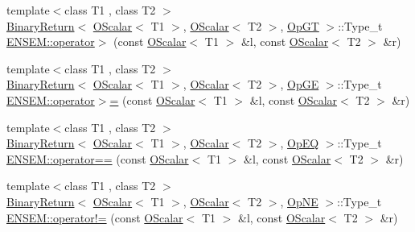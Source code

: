 \begin{DoxyCompactItemize}
\item 
{\footnotesize template$<$class T1 , class T2 $>$ }\\\mbox{\hyperlink{structENSEM_1_1BinaryReturn}{Binary\+Return}}$<$ \mbox{\hyperlink{classENSEM_1_1OScalar}{O\+Scalar}}$<$ T1 $>$, \mbox{\hyperlink{classENSEM_1_1OScalar}{O\+Scalar}}$<$ T2 $>$, \mbox{\hyperlink{structENSEM_1_1OpGT}{Op\+GT}} $>$\+::Type\+\_\+t \mbox{\hyperlink{group__obsscalar_ga8a16530cd60ff38f2be9575251898ac2}{E\+N\+S\+E\+M\+::operator$>$}} (const \mbox{\hyperlink{classENSEM_1_1OScalar}{O\+Scalar}}$<$ T1 $>$ \&l, const \mbox{\hyperlink{classENSEM_1_1OScalar}{O\+Scalar}}$<$ T2 $>$ \&r)
\item 
{\footnotesize template$<$class T1 , class T2 $>$ }\\\mbox{\hyperlink{structENSEM_1_1BinaryReturn}{Binary\+Return}}$<$ \mbox{\hyperlink{classENSEM_1_1OScalar}{O\+Scalar}}$<$ T1 $>$, \mbox{\hyperlink{classENSEM_1_1OScalar}{O\+Scalar}}$<$ T2 $>$, \mbox{\hyperlink{structENSEM_1_1OpGE}{Op\+GE}} $>$\+::Type\+\_\+t \mbox{\hyperlink{group__obsscalar_ga662fdae406fd639518843fb671368f0d}{E\+N\+S\+E\+M\+::operator$>$=}} (const \mbox{\hyperlink{classENSEM_1_1OScalar}{O\+Scalar}}$<$ T1 $>$ \&l, const \mbox{\hyperlink{classENSEM_1_1OScalar}{O\+Scalar}}$<$ T2 $>$ \&r)
\item 
{\footnotesize template$<$class T1 , class T2 $>$ }\\\mbox{\hyperlink{structENSEM_1_1BinaryReturn}{Binary\+Return}}$<$ \mbox{\hyperlink{classENSEM_1_1OScalar}{O\+Scalar}}$<$ T1 $>$, \mbox{\hyperlink{classENSEM_1_1OScalar}{O\+Scalar}}$<$ T2 $>$, \mbox{\hyperlink{structENSEM_1_1OpEQ}{Op\+EQ}} $>$\+::Type\+\_\+t \mbox{\hyperlink{group__obsscalar_ga95c536ecc3b51c1ac09a016d357d7237}{E\+N\+S\+E\+M\+::operator==}} (const \mbox{\hyperlink{classENSEM_1_1OScalar}{O\+Scalar}}$<$ T1 $>$ \&l, const \mbox{\hyperlink{classENSEM_1_1OScalar}{O\+Scalar}}$<$ T2 $>$ \&r)
\item 
{\footnotesize template$<$class T1 , class T2 $>$ }\\\mbox{\hyperlink{structENSEM_1_1BinaryReturn}{Binary\+Return}}$<$ \mbox{\hyperlink{classENSEM_1_1OScalar}{O\+Scalar}}$<$ T1 $>$, \mbox{\hyperlink{classENSEM_1_1OScalar}{O\+Scalar}}$<$ T2 $>$, \mbox{\hyperlink{structENSEM_1_1OpNE}{Op\+NE}} $>$\+::Type\+\_\+t \mbox{\hyperlink{group__obsscalar_ga0dc8425f7eb49097253c996107d2ff8e}{E\+N\+S\+E\+M\+::operator!=}} (const \mbox{\hyperlink{classENSEM_1_1OScalar}{O\+Scalar}}$<$ T1 $>$ \&l, const \mbox{\hyperlink{classENSEM_1_1OScalar}{O\+Scalar}}$<$ T2 $>$ \&r)
\item 

\end{DoxyCompactItemize}
